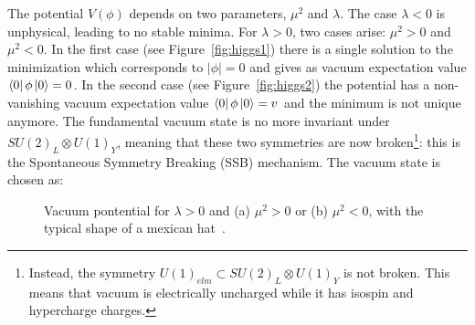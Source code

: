 The potential $V(\phi)$ depends on two parameters, $\mu^2$ and $\lambda$. 
The case $\lambda<0$ is unphysical, leading to no stable minima. For 
$\lambda>0$, two cases arise: $\mu^2>0$ and $\mu^2<0$. In the first case
(see Figure~\ref{fig:higgs1}) there is a single solution to the minimization
which corresponds to $|\phi|=0$ and gives as vacuum expectation value
$\bra{0}\phi \ket{0} = 0$. In the second case (see Figure~\ref{fig:higgs2}) 
the potential has a non-vanishing vacuum expectation value 
$\bra{0}\phi \ket{0} = v$ and %
the minimum is not unique anymore. The fundamental vacuum 
state is no more invariant under $SU(2)_{L} \otimes U(1)_{Y}$, 
meaning that these two symmetries are now 
broken\footnote{Instead, the symmetry $U(1)_{elm} \subset SU(2)_{L} \otimes U(1)_{Y}$ 
is not broken. This means that vacuum is electrically uncharged while 
it has isospin and hypercharge charges.}: 
this is the Spontaneous Symmetry Breaking (SSB) mechanism. 
The vacuum state is chosen as:
\begin{figure}[h!tb]\begin{center}
	\caption{Vacuum pontential for $\lambda>0$ and (a) $\mu^2>0$ or
          (b) $\mu^2<0$, with the typical shape of a mexican hat~\cite{Michael:1569839}.}
\end{center}\end{figure}

